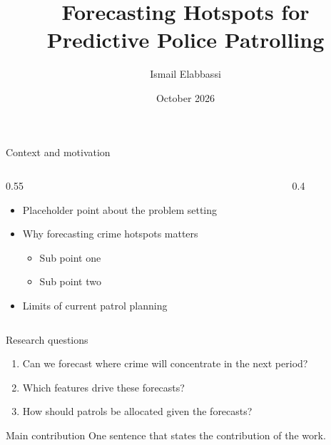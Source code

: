 \documentclass[aspectratio=169,11pt,t]{beamer}
\title[Forecasting Hotspots for Predictive Police Patrolling]
      {Forecasting Hotspots for\\Predictive Police Patrolling}
\author[Ismail Elabbassi]{Ismail Elabbassi}
\date{October 2026}
\begin{document}
\titleframe
\outlineframe


\begin{frame}{Context and motivation}
  \begin{columns}[T,onlytextwidth]
    \begin{column}{0.55\textwidth}
      \begin{itemize}
        \item Placeholder point about the problem setting
        \item Why forecasting crime hotspots matters
        \begin{itemize}
          \item Sub point one
          \item Sub point two
        \end{itemize}
        \item Limits of current patrol planning
      \end{itemize}
    \end{column}
    \begin{column}{0.4\textwidth}
      \centering
    \end{column}
  \end{columns}
\end{frame}

\begin{frame}{Research questions}
  \begin{enumerate}
    \item Can we forecast where crime will concentrate in the next period?
    \item Which features drive these forecasts?
    \item How should patrols be allocated given the forecasts?
  \end{enumerate}
  \vskip0.4cm
  \begin{block}{Main contribution}
    One sentence that states the contribution of the work.
  \end{block}
\end{frame}

\end{document}
